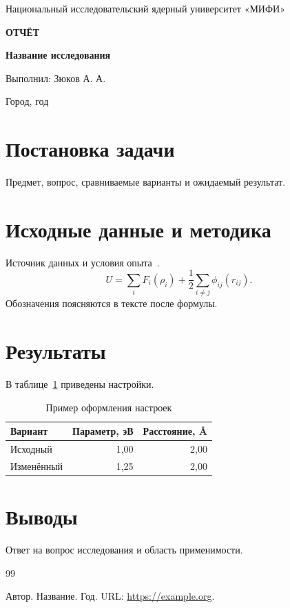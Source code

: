 \documentclass[14pt,a4paper]{extarticle}
\begin{document}
\sloppy
\thispagestyle{empty}
\begin{center}
Национальный исследовательский ядерный университет «МИФИ»
\vspace{3cm}

{\bfseries ОТЧЁТ}
\vspace{1cm}

{\bfseries Название исследования}
\end{center}
\vfill
\begin{flushright}
Выполнил: Зюков А. А.
\end{flushright}
\vfill
\begin{center}
Город, год
\end{center}
\newpage
\tableofcontents
\newpage
\section{Постановка задачи}
Предмет, вопрос, сравниваемые варианты и ожидаемый результат.
\section{Исходные данные и методика}
Источник данных и условия опыта~\cite{manual}.
\begin{equation}
U=\sum_i F_i(\rho_i)+\frac12\sum_{i\ne j}\phi_{ij}(r_{ij}).
\label{eq:energy}
\end{equation}
Обозначения поясняются в тексте после формулы.
\section{Результаты}
В таблице~\ref{tab:settings} приведены настройки.
\begin{table}[htbp]
\centering
\caption{Пример оформления настроек}
\label{tab:settings}
\small
\begin{tabularx}{\textwidth}{@{}Xrr@{}}
\toprule
Вариант & Параметр, эВ & Расстояние, \AA\\
\midrule
Исходный & 1,00 & 2,00\\
Изменённый & 1,25 & 2,00\\
\bottomrule
\end{tabularx}
\end{table}
\section{Выводы}
Ответ на вопрос исследования и область применимости.
\begin{thebibliography}{99}
 Автор. Название. Год. URL: \url{https://example.org}.
\end{thebibliography}
\end{document}
